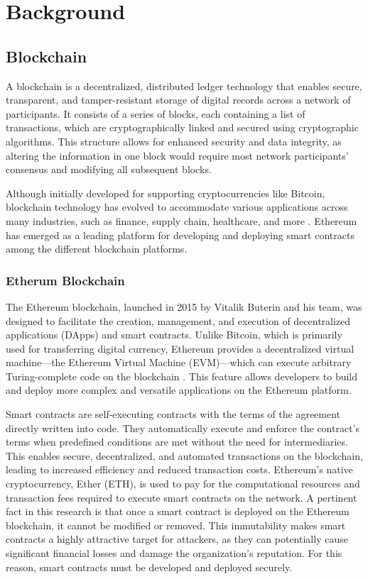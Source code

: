 \chapter{Background}
\label{background}

\section{Blockchain}

A blockchain is a decentralized, distributed ledger technology that enables secure, transparent, and tamper-resistant storage of digital records across a network of participants. It consists of a series of blocks, each containing a list of transactions, which are cryptographically linked and secured using cryptographic algorithms. This structure allows for enhanced security and data integrity, as altering the information in one block would require most network participants' consensus and modifying all subsequent blocks.

Although initially developed for supporting cryptocurrencies like Bitcoin, blockchain technology has evolved to accommodate various applications across many industries, such as finance, supply chain, healthcare, and more \cite{Xu2019} \cite{ibm-blockchain}. Ethereum has emerged as a leading platform for developing and deploying smart contracts among the different blockchain platforms.

\subsection{Etherum Blockchain}

The Ethereum blockchain, launched in 2015 by Vitalik Buterin and his team, was designed to facilitate the creation, management, and execution of decentralized applications (DApps) and smart contracts. Unlike Bitcoin, which is primarily used for transferring digital currency, Ethereum provides a decentralized virtual machine—the Ethereum Virtual Machine (EVM)—which can execute arbitrary Turing-complete code on the blockchain \cite{hildenbrandt2017kevm}. This feature allows developers to build and deploy more complex and versatile applications on the Ethereum platform.

Smart contracts are self-executing contracts with the terms of the agreement directly written into code. They automatically execute and enforce the contract's terms when predefined conditions are met without the need for intermediaries. This enables secure, decentralized, and automated transactions on the blockchain, leading to increased efficiency and reduced transaction costs. Ethereum's native cryptocurrency, Ether (ETH), is used to pay for the computational resources and transaction fees required to execute smart contracts on the network. A pertinent fact in this research is that once a smart contract is deployed on the Ethereum blockchain, it cannot be modified or removed. This immutability makes smart contracts a highly attractive target for attackers, as they can potentially cause significant financial losses and damage the organization's reputation. For this reason, smart contracts must be developed and deployed securely.

